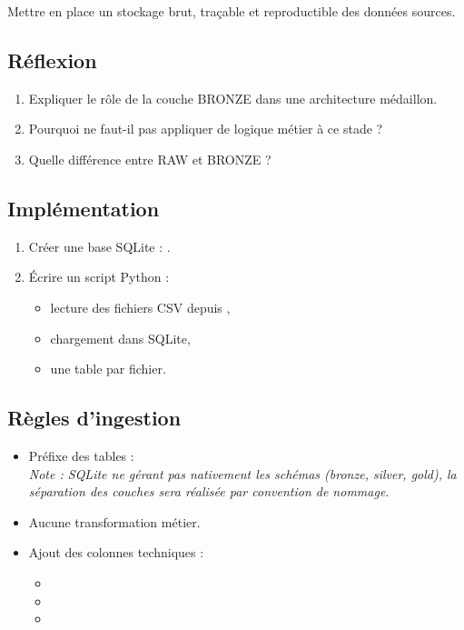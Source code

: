 \documentclass[11pt,a4paper]{article}
\begin{document}
Mettre en place un stockage brut, traçable et reproductible des données sources.

\subsection{Réflexion}

\begin{enumerate}
  \item Expliquer le rôle de la couche BRONZE dans une architecture médaillon.
  \item Pourquoi ne faut-il pas appliquer de logique métier à ce stade ?
  \item Quelle différence entre RAW et BRONZE ?
\end{enumerate}

\subsection{Implémentation}

\begin{enumerate}
  \item Créer une base SQLite : .
  \item Écrire un script Python  :
  \begin{itemize}
    \item lecture des fichiers CSV depuis ,
    \item chargement dans SQLite,
    \item une table par fichier.
  \end{itemize}
\end{enumerate}

\subsection*{Règles d’ingestion}

\begin{itemize}
  \item Préfixe des tables : \\\textit{Note : SQLite ne gérant pas nativement les schémas (bronze, silver, gold), la séparation des couches sera réalisée par convention de nommage.}
  \item Aucune transformation métier.
  \item Ajout des colonnes techniques :
  \begin{itemize}
    \item {}
    \item {}
    \item {}
  \end{itemize}
\end{itemize}
\end{document}
